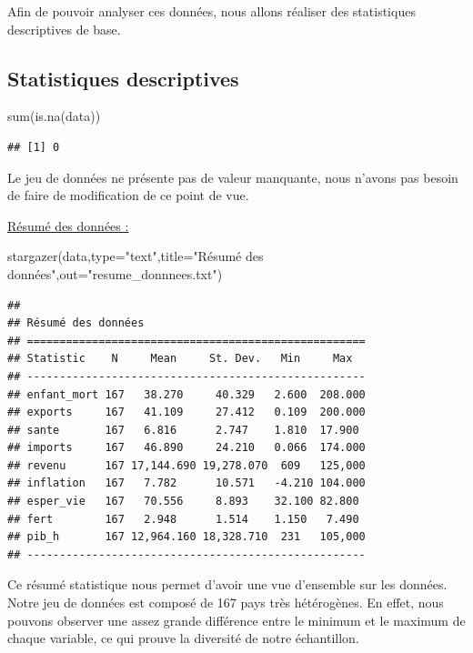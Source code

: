 \documentclass[
]{article}
\newenvironment{Shaded}{\begin{snugshade}}{\end{snugshade}}
\newcommand{\AttributeTok}[1]{\textcolor[rgb]{0.77,0.63,0.00}{#1}}
\newcommand{\FunctionTok}[1]{\textcolor[rgb]{0.00,0.00,0.00}{#1}}
\newcommand{\NormalTok}[1]{#1}
\newcommand{\StringTok}[1]{\textcolor[rgb]{0.31,0.60,0.02}{#1}}
\begin{document}
Afin de pouvoir analyser ces données, nous allons réaliser des
statistiques descriptives de base.

\hypertarget{statistiques-descriptives}{%
\subsection{Statistiques descriptives}\label{statistiques-descriptives}}

\begin{Shaded}
\begin{Highlighting}[]
\FunctionTok{sum}\NormalTok{(}\FunctionTok{is.na}\NormalTok{(data))}
\end{Highlighting}
\end{Shaded}

\begin{verbatim}
## [1] 0
\end{verbatim}

Le jeu de données ne présente pas de valeur manquante, nous n'avons pas
besoin de faire de modification de ce point de vue.

\uline{Résumé des données :}

\begin{Shaded}
\begin{Highlighting}[]
\FunctionTok{stargazer}\NormalTok{(data,}\AttributeTok{type=}\StringTok{"text"}\NormalTok{,}\AttributeTok{title=}\StringTok{"Résumé des données"}\NormalTok{,}\AttributeTok{out=}\StringTok{"resume\_donnnees.txt"}\NormalTok{)}
\end{Highlighting}
\end{Shaded}

\begin{verbatim}
## 
## Résumé des données
## ====================================================
## Statistic    N     Mean     St. Dev.   Min     Max  
## ----------------------------------------------------
## enfant_mort 167   38.270     40.329   2.600  208.000
## exports     167   41.109     27.412   0.109  200.000
## sante       167   6.816      2.747    1.810  17.900 
## imports     167   46.890     24.210   0.066  174.000
## revenu      167 17,144.690 19,278.070  609   125,000
## inflation   167   7.782      10.571   -4.210 104.000
## esper_vie   167   70.556     8.893    32.100 82.800 
## fert        167   2.948      1.514    1.150   7.490 
## pib_h       167 12,964.160 18,328.710  231   105,000
## ----------------------------------------------------
\end{verbatim}

Ce résumé statistique nous permet d'avoir une vue d'ensemble sur les
données.\\
Notre jeu de données est composé de 167 pays très hétérogènes. En effet,
nous pouvons observer une assez grande différence entre le minimum et le
maximum de chaque variable, ce qui prouve la diversité de notre
échantillon.
\end{document}
